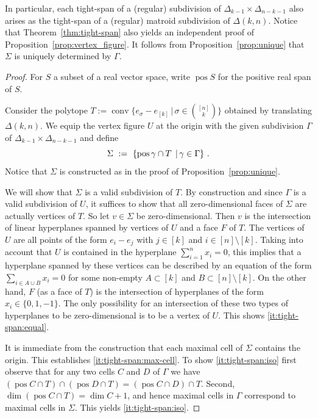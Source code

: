 \documentclass[11pt,a4paper]{amsart}
\newcommand{\SetOf}[2]{\left\{#1\vphantom{#2}\,\right.\left|\,\vphantom{#1}#2\right\}}
\newcommand{\smallSetOf}[2]{\{#1\,|\,#2\}}
\DeclareMathOperator{\conv}{conv}
\DeclareMathOperator{\pos}{pos}
\theoremstyle{plain}
\theoremstyle{definition}
\begin{document}
In particular, each tight-span of a (regular) subdivision of $\Delta_{k-1}\times\Delta_{n-k-1}$ also
arises as the tight-span of a (regular) matroid subdivision of $\Delta(k,n)$.  Notice that
Theorem~\ref{thm:tight-span} also yields an independent proof of
Proposition~\ref{prop:vertex_figure}.  It follows from Proposition~\ref{prop:unique} that $\Sigma$
is uniquely determined by $\Gamma$.

\begin{proof}
  For $S$ a subset of a real vector space, write $\pos S$ for the positive real span of $S$.

  Consider the polytope $T:=\conv{\smallSetOf{e_\sigma-e_{[k]}}{\sigma\in\binom{[n]}k}}$ obtained by
  translating $\Delta(k,n)$.  We equip the vertex figure $U$ at the origin with the given subdivision
  $\Gamma$ of $\Delta_{k-1}\times\Delta_{n-k-1}$ and define
  \begin{equation}\label{eq:Sigma}
    \Sigma \ := \ \SetOf{\pos \gamma \cap T}{\gamma \in \Gamma}\,.
  \end{equation}
  Notice that $\Sigma$ is constructed as in the proof of Proposition~\ref{prop:unique}.

  We will show that $\Sigma$ is a valid subdivision of $T$.  By construction and since $\Gamma$ is a
  valid subdivision of $U$, it suffices to show that all zero-dimensional faces of $\Sigma$ are
  actually vertices of $T$.  So let $v\in \Sigma$ be zero-dimensional.  Then $v$ is the intersection
  of linear hyperplanes spanned by vertices of $U$ and a face $F$ of $T$.  The vertices of $U$ are
  all points of the form $e_i-e_j$ with $j\in[k]$ and $i\in [n]\setminus [k]$. Taking into account
  that $U$ is contained in the hyperplane $\sum_{i=1}^n x_i=0$, this implies that a hyperplane
  spanned by these vertices can be described by an equation of the form $\sum_{i \in A\cup B}x_i=0$
  for some non-empty $A\subset [k]$ and $B\subset [n]\setminus [k]$.  On the other hand, $F$ (as a
  face of $T$) is the intersection of hyperplanes of the form $x_i\in\{0,1,-1\}$. The only
  possibility for an intersection of these two types of hyperplanes to be zero-dimensional is to be
  a vertex of $U$.  This shows \eqref{it:tight-span:equal}.

  It is immediate from the construction that each maximal cell of $\Sigma$ contains the origin.
  This establishes \eqref{it:tight-span:max-cell}.  To show \eqref{it:tight-span:iso} first observe
  that for any two cells $C$ and $D$ of $\Gamma$ we have $(\pos C\cap T)\cap(\pos D\cap T)=(\pos
  C\cap D)\cap T$.  Second, $\dim(\pos C\cap T)=\dim C+1$, and hence maximal cells in $\Gamma$
  correspond to maximal cells in $\Sigma$.  This yields \eqref{it:tight-span:iso}.


\end{proof}
\end{document}
